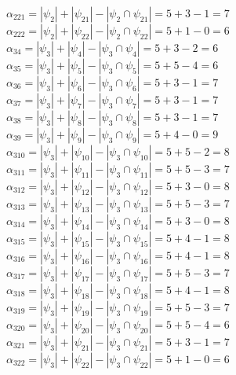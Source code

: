 \documentclass[a4paper,12pt]{article}
\begin{document}
$\alpha_{221} = |\psi_{2}| + |\psi_{21}| - |\psi_{2} \cap \psi_{21}| = 5 + 3 - 1 = 7$\\
$\alpha_{222} = |\psi_{2}| + |\psi_{22}| - |\psi_{2} \cap \psi_{22}| = 5 + 1 - 0 = 6$\\
$\alpha_{34} = |\psi_{3}| + |\psi_{4}| - |\psi_{3} \cap \psi_{4}| = 5 + 3 - 2 = 6$\\
$\alpha_{35} = |\psi_{3}| + |\psi_{5}| - |\psi_{3} \cap \psi_{5}| = 5 + 5 - 4 = 6$\\
$\alpha_{36} = |\psi_{3}| + |\psi_{6}| - |\psi_{3} \cap \psi_{6}| = 5 + 3 - 1 = 7$\\
$\alpha_{37} = |\psi_{3}| + |\psi_{7}| - |\psi_{3} \cap \psi_{7}| = 5 + 3 - 1 = 7$\\
$\alpha_{38} = |\psi_{3}| + |\psi_{8}| - |\psi_{3} \cap \psi_{8}| = 5 + 3 - 1 = 7$\\
$\alpha_{39} = |\psi_{3}| + |\psi_{9}| - |\psi_{3} \cap \psi_{9}| = 5 + 4 - 0 = 9$\\
$\alpha_{310} = |\psi_{3}| + |\psi_{10}| - |\psi_{3} \cap \psi_{10}| = 5 + 5 - 2 = 8$\\
$\alpha_{311} = |\psi_{3}| + |\psi_{11}| - |\psi_{3} \cap \psi_{11}| = 5 + 5 - 3 = 7$\\
$\alpha_{312} = |\psi_{3}| + |\psi_{12}| - |\psi_{3} \cap \psi_{12}| = 5 + 3 - 0 = 8$\\
$\alpha_{313} = |\psi_{3}| + |\psi_{13}| - |\psi_{3} \cap \psi_{13}| = 5 + 5 - 3 = 7$\\
$\alpha_{314} = |\psi_{3}| + |\psi_{14}| - |\psi_{3} \cap \psi_{14}| = 5 + 3 - 0 = 8$\\
$\alpha_{315} = |\psi_{3}| + |\psi_{15}| - |\psi_{3} \cap \psi_{15}| = 5 + 4 - 1 = 8$\\
$\alpha_{316} = |\psi_{3}| + |\psi_{16}| - |\psi_{3} \cap \psi_{16}| = 5 + 4 - 1 = 8$\\
$\alpha_{317} = |\psi_{3}| + |\psi_{17}| - |\psi_{3} \cap \psi_{17}| = 5 + 5 - 3 = 7$\\
$\alpha_{318} = |\psi_{3}| + |\psi_{18}| - |\psi_{3} \cap \psi_{18}| = 5 + 4 - 1 = 8$\\
$\alpha_{319} = |\psi_{3}| + |\psi_{19}| - |\psi_{3} \cap \psi_{19}| = 5 + 5 - 3 = 7$\\
$\alpha_{320} = |\psi_{3}| + |\psi_{20}| - |\psi_{3} \cap \psi_{20}| = 5 + 5 - 4 = 6$\\
$\alpha_{321} = |\psi_{3}| + |\psi_{21}| - |\psi_{3} \cap \psi_{21}| = 5 + 3 - 1 = 7$\\
$\alpha_{322} = |\psi_{3}| + |\psi_{22}| - |\psi_{3} \cap \psi_{22}| = 5 + 1 - 0 = 6$\\
\end{document}
